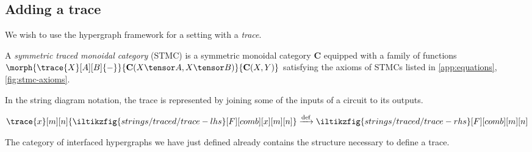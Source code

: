 \subsection{Adding a trace}

We wish to use the hypergraph framework for a setting with a \emph{trace}.

\begin{definition}
    A \emph{symmetric traced monoidal category} (STMC) is a symmetric monoidal
    category \(\mathbf{C}\) equipped with a family of functions \(
        \morph{
            \trace{X}[A][B]{-}
        }{
            \mathbf{C}(X \tensor A, X \tensor B)
        }{
            \mathbf{C}(X, Y)
        }
    \) satisfying the axioms of STMCs listed in \cref{app:equations},
    \cref{fig:stmc-axioms}.
\end{definition}

In the string diagram notation, the trace is represented by joining some of the
inputs of a circuit to its outputs.
%
\begin{center}
    \(
        \trace{x}[m][n]{\iltikzfig{strings/traced/trace-lhs}[F][comb][x][m][n]}
        \xrightarrow{\text{def}}
        \iltikzfig{strings/traced/trace-rhs}[F][comb][m][n]
    \)
\end{center}

The category of interfaced hypergraphs we have just defined already
contains the structure necessary to define a trace.

